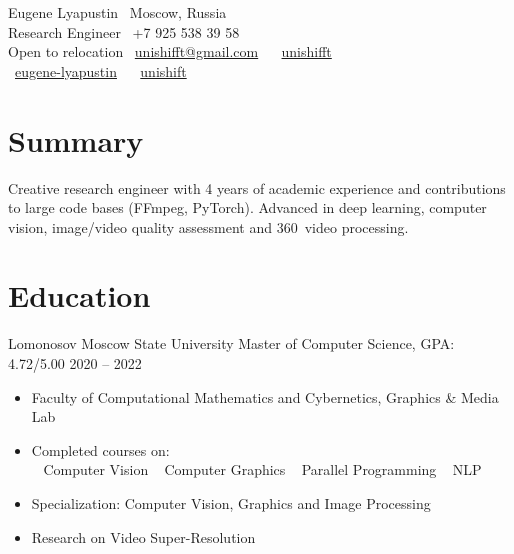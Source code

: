 \documentclass{tccv}
\newcommand{\sphere}{360\textdegree~}
\begin{document}
{ Eugene Lyapustin} \hfill \faMapMarker~Moscow, Russia \\
{\Large Research Engineer} \hfill \faPhone~+7 925 538 39 58 \\
Open to relocation \hfill \faEnvelope~\href{mailto:unishifft@gmail.com}{unishifft@gmail.com} ~ \faTelegramPlane~\href{https://t.me/unishifft}{unishifft}\\
\null\hfill \faLinkedin~\href{https://linkedin.com/in/eugene-lyapustin}{eugene-lyapustin} ~ \faGithub~\href{https://github.com/unishift/}{unishift}


\section{Summary}

Creative research engineer with 4 years of academic experience and contributions to large code bases (FFmpeg, PyTorch). Advanced in deep learning, computer vision, image/video quality assessment and \sphere video processing.

\section{Education}

\begin{eventlist}

\evententry{}
     {Lomonosov Moscow State University}
     {Master of Computer Science, GPA: 4.72/5.00}
     {2020 -- 2022}
\begin{itemize}
     \item Faculty of Computational Mathematics and Cybernetics, Graphics \& Media Lab
     \item Completed courses on:\\
          \faAngleRight~ Computer Vision\qquad
          \faAngleRight~ Computer Graphics\qquad
          \faAngleRight~ Parallel Programming\qquad
          \faAngleRight~ NLP
     \item Specialization: Computer Vision, Graphics and Image Processing
     \item Research on Video Super-Resolution
\end{itemize}


\end{eventlist}
\end{document}
